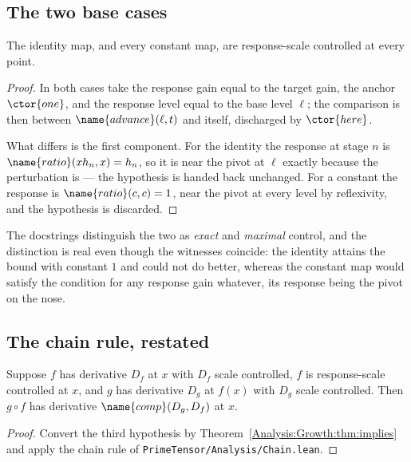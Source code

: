 \subsection{The two base cases}

\begin{lemma}
\label{Analysis:Growth:lem:examples}
The identity map, and every constant map, are response-scale controlled at
every point.
\end{lemma}

\begin{proof}
In both cases take the response gain equal to the target gain, the anchor
$\ctor{one}$, and the response level equal to the base level $\ell$; the
comparison is then between $\name{advance}(\ell,t)$ and itself, discharged by
$\ctor{here}$.

What differs is the first component.  For the identity the response at stage
$n$ is $\name{ratio}(x h_n, x) = h_n$, so it is near the pivot at $\ell$
exactly because the perturbation is --- the hypothesis is handed back
unchanged.  For a constant the response is $\name{ratio}(c,c) = 1$, near the
pivot at every level by reflexivity, and the hypothesis is discarded.
\end{proof}

The docstrings distinguish the two as \emph{exact} and \emph{maximal} control,
and the distinction is real even though the witnesses coincide: the identity
attains the bound with constant $1$ and could not do better, whereas the
constant map would satisfy the condition for any response gain whatever, its
response being the pivot on the nose.

\subsection{The chain rule, restated}

\begin{theorem}
\label{Analysis:Growth:thm:chain}
Suppose $f$ has derivative $D_f$ at $x$ with $D_f$ scale controlled, $f$ is
response-scale controlled at $x$, and $g$ has derivative $D_g$ at $f(x)$ with
$D_g$ scale controlled.  Then $g \circ f$ has derivative
$\name{comp}(D_g,D_f)$ at $x$.
\end{theorem}

\begin{proof}
Convert the third hypothesis by Theorem~\ref{Analysis:Growth:thm:implies} and
apply the chain rule of \texttt{PrimeTensor/Analysis/Chain.lean}.
\end{proof}

